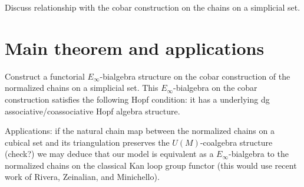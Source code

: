 \documentclass{amsart}
\begin{document}
Discuss relationship with the cobar construction on the chains on a simplicial set. 

\section{Main theorem and applications}

Construct a functorial $E_{\infty}$-bialgebra structure on the cobar construction of the normalized chains on a simplicial set. This $E_{\infty}$-bialgebra on the cobar construction satisfies the following Hopf condition: it has a underlying dg associative/coassociative Hopf algebra structure. 

Applications: if the natural chain map between the normalized chains on a cubical set and its triangulation preserves the $U(M)$-coalgebra structure (check?) we may deduce that our model is equivalent as a $E_{\infty}$-bialgebra to the normalized chains on the classical Kan loop group functor (this would use recent work of Rivera, Zeinalian, and Minichello). 


\end{document}
